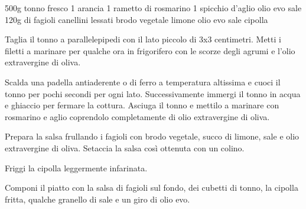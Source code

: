 \begin{ingreds}
	500g tonno fresco 
	1 arancia
	1 rametto di rosmarino 
	1 spicchio d'aglio
	olio evo 
	sale
\columnbreak
{}
	120g di fagioli canellini lessati 
	brodo vegetale
	limone 
	olio evo 
	sale
	cipolla 
\end{ingreds}

\begin{method}

Taglia il tonno a parallelepipedi con il lato piccolo di 3x3 centimetri. Metti i filetti a marinare per qualche ora in frigorifero con le scorze degli agrumi e l'olio extravergine di oliva.

Scalda una padella antiaderente o di ferro a temperatura altissima e cuoci il tonno per pochi secondi per ogni lato. Successivamente immergi il tonno in acqua e ghiaccio per fermare la cottura. Asciuga il tonno e mettilo a marinare con rosmarino e aglio coprendolo completamente di olio extravergine di oliva.

Prepara la salsa frullando i fagioli con brodo vegetale, succo di limone, sale e olio extravergine di oliva. Setaccia la salsa così ottenuta con un colino.

Friggi la cipolla leggermente infarinata.

Componi il piatto con la salsa di fagioli sul fondo, dei cubetti di tonno, la cipolla fritta, qualche granello di sale e un giro di olio evo.
\end{method}
